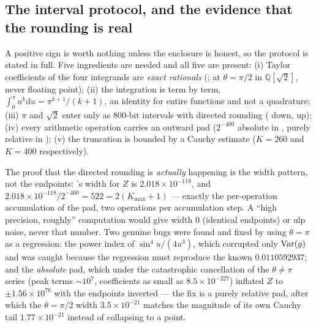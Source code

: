 
\subsection{The interval protocol, and the evidence that the rounding is real}

A positive sign is worth nothing unless the enclosure is honest, so the protocol is stated in
full. Five ingredients are needed and all five are present:
(i) Taylor coefficients of the four integrands are \emph{exact rationals} (; at
$\theta=\pi/2$ in $\mathbb{Q}[\sqrt2]$, never floating point);
(ii) the integration is term by term, $\int_0^{\pi}u^{k}\mathrm{d}u=\pi^{k+1}/(k+1)$, an identity
for entire functions and not a quadrature;
(iii) $\pi$ and $\sqrt2$ enter only as $800$-bit  intervals with directed rounding
( down,  up);
(iv) every arithmetic operation carries an outward pad ($2^{-400}$ absolute in ,
purely relative in );
(v) the truncation is bounded by a Cauchy estimate ($K=260$ and $K=400$ respectively).
\LT{}

The proof that the directed rounding is \emph{actually} happening is the width pattern, not the
endpoints: 's width for $Z$ is $2.018\times10^{-118}$, and
$2.018\times10^{-118}/2^{-400}=522=2(K_{\max}+1)$ --- exactly the per-operation accumulation of the
pad, two operations per accumulation step. A ``high precision, roughly'' computation would give
width $0$ (identical endpoints) or ulp noise, never that number. \LT{} Two genuine bugs were found
and fixed by using $\theta=\pi$ as a regression: the power index of $\sin^{4}u/(4u^{3})$, which
corrupted only $\operatorname{Var}(g)$ and was caught because the regression must reproduce the known
$0.0110592937$; and the \emph{absolute} pad, which under the catastrophic cancellation of the
$\theta\ne\pi$ series (peak terms $\sim10^{7}$, coefficients as small as $8.5\times10^{-227}$)
inflated $Z$ to $\pm1.56\times10^{76}$ with the endpoints inverted --- the fix is a purely
relative pad, after which the $\theta=\pi/2$ width $3.5\times10^{-21}$ matches the magnitude of its
own Cauchy tail $1.77\times10^{-21}$ instead of collapsing to a point. \LT{}

